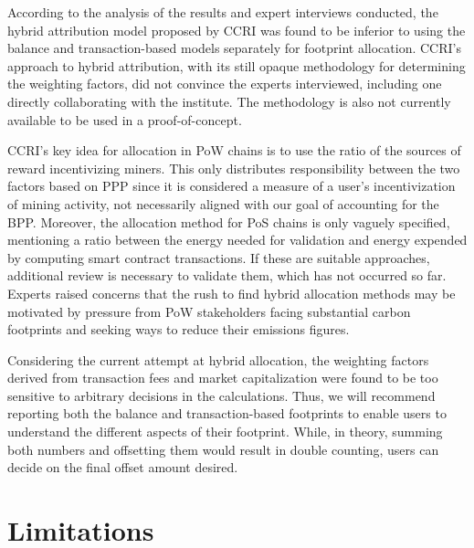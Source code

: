 \documentclass[11pt]{report}
\begin{document}
According to the analysis of the results and expert interviews conducted, the hybrid attribution model proposed by CCRI was found to be inferior to using the balance and transaction-based models separately for footprint allocation. CCRI's approach to hybrid attribution, with its still opaque methodology for determining the weighting factors, did not convince the experts interviewed, including one directly collaborating with the institute. The methodology is also not currently available to be used in a proof-of-concept.

CCRI's key idea for allocation in PoW chains is to use the ratio of the sources of reward incentivizing miners. This only distributes responsibility between the two factors based on PPP since it is considered a measure of a user's incentivization of mining activity, not necessarily aligned with our goal of accounting for the \ac{BPP}. Moreover, the allocation method for PoS chains is only vaguely specified, mentioning a ratio between the energy needed for validation and energy expended by computing smart contract transactions. If these are suitable approaches, additional review is necessary to validate them, which has not occurred so far. Experts raised concerns that the rush to find hybrid allocation methods may be motivated by pressure from PoW stakeholders facing substantial carbon footprints and seeking ways to reduce their emissions figures.

Considering the current attempt at hybrid allocation, the weighting factors derived from transaction fees and market capitalization were found to be too sensitive to arbitrary decisions in the calculations. Thus, we will recommend reporting both the balance and transaction-based footprints to enable users to understand the different aspects of their footprint. While, in theory, summing both numbers and offsetting them would result in double counting, users can decide on the final offset amount desired.

\section{Limitations \label{se:limitations}}
\end{document}
